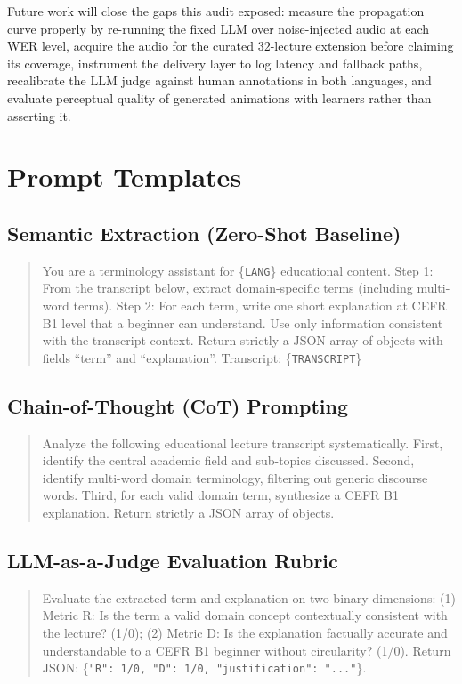 \documentclass[conference]{IEEEtran}
\begin{document}
Future work will close the gaps this audit exposed: measure the propagation curve properly by re-running the fixed LLM over noise-injected audio at each WER level, acquire the audio for the curated $32$-lecture extension before claiming its coverage, instrument the delivery layer to log latency and fallback paths, recalibrate the LLM judge against human annotations in both languages, and evaluate perceptual quality of generated animations with learners rather than asserting it.

\appendix
\label{app:prompt}
\section{Prompt Templates}

\subsection{Semantic Extraction (Zero-Shot Baseline)}
\begin{quote}
\small
You are a terminology assistant for \{\texttt{LANG}\} educational content. Step 1: From the transcript below, extract domain-specific terms (including multi-word terms). Step 2: For each term, write one short explanation at CEFR B1 level that a beginner can understand. Use only information consistent with the transcript context. Return strictly a JSON array of objects with fields ``term'' and ``explanation''. Transcript: \{\texttt{TRANSCRIPT}\}
\end{quote}

\subsection{Chain-of-Thought (CoT) Prompting}
\begin{quote}
\small
Analyze the following educational lecture transcript systematically. First, identify the central academic field and sub-topics discussed. Second, identify multi-word domain terminology, filtering out generic discourse words. Third, for each valid domain term, synthesize a CEFR B1 explanation. Return strictly a JSON array of objects.
\end{quote}

\subsection{LLM-as-a-Judge Evaluation Rubric}
\begin{quote}
\small
Evaluate the extracted term and explanation on two binary dimensions: (1) Metric R: Is the term a valid domain concept contextually consistent with the lecture? (1/0); (2) Metric D: Is the explanation factually accurate and understandable to a CEFR B1 beginner without circularity? (1/0). Return JSON: \{\texttt{"R": 1/0, "D": 1/0, "justification": "..."}\}.
\end{quote}
\end{document}
